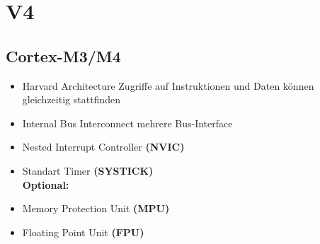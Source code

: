 \section{V4}

\subsection{Cortex-M3/M4}
\begin{itemize}
    \item Harvard Architecture
    \subitem \rightarrow Zugriffe auf Instruktionen und Daten können gleichzeitig stattfinden
    \item Internal Bus Interconnect
    \subitem \rightarrow mehrere Bus-Interface 
    \item Nested Interrupt Controller \textbf{(NVIC)}
    \item Standart Timer \textbf{(SYSTICK)}\\
    \textbf{Optional:}
    \item Memory Protection Unit \textbf{(MPU)}
    \item Floating Point Unit \textbf{(FPU)}
\end{itemize}
